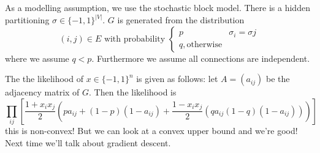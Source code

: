 \documentclass[12pt]{article}
\begin{document}
As a modelling assumption, we use the stochastic block model. There is a hidden partitioning $\sigma\in \{-1,1\}^|V|.$ $G$ is generated from the distribution
\[(i,j)\in E\text{ with probability }\left\{\begin{array}{lr}p & \sigma_i=\sigma j\\ q, \text{otherwise}\end{array}\right. \]
where we assume $q<p$. Furthermore we assume all connections are independent.

The the likelihood of $x\in\{-1,1\}^n$ is given as follows: let $A=(a_{ij})$ be the adjacency matrix of $G$. Then the likelihood is 
\[\prod_{ij}\left[\frac{1+x_ix_j}{2}\left(pa_{ij}+(1-p)(1-a_{ij})+\frac{1-x_ix_j}{2}(qa_{ij}(1-q)(1-a_{ij}))\right)\right]\]
this is non-convex! But we can look at a convex upper bound and we're good! Next time we'll talk about gradient descent.
\end{document}
